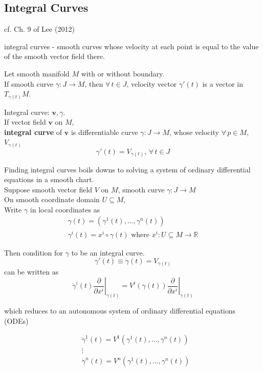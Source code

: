 \subsection{Integral Curves}

cf. Ch. 9 of Lee (2012) \cite{dgdt:JLee2012}

integral curves - smooth curves whose velocity at each point is equal to the value of the smooth vector field there. 

Let smooth manifold $M$ with or without boundary. \\
If smooth curve $\gamma : J \to M$, then $\forall \, t \in J$, velocity vector $\gamma'(t)$ is a vector in $T_{\gamma(t)}M$.  \\

\begin{definition}
Integral curve: $\mathbf{v}, \gamma$. \\
If vector field $\mathbf{v}$ on $M$, \\
\textbf{integral curve} of $\mathbf{v}$ is differentiable curve $\gamma : J \to M$, whose velocity $\forall \, p \in M$, $V_{\gamma(t)}$
\[
\gamma'(t) = V_{\gamma(t)}, \, \forall \, t \in J
\]
\end{definition}

Finding integral curves boils downs to solving a system of ordinary differential equations in a smooth chart. \\
Suppose smooth vector field $V$ on $M$, smooth curve $\gamma : J \to M$ \\
On smooth coordinate domain $U \subseteq M$, \\
Write $\gamma$ in local coordinates as 
\[
\begin{gathered}
	\gamma(t) = (\gamma^{1}(t), \dots , \gamma^{n}(t)) \\
	\gamma^i(t) = x^i \circ \gamma(t) \text{ where } x^i : U \subseteq M \to \mathbb{R} 
\end{gathered}
\]

Then condition for $\gamma$ to be an integral curve.
\[
\gamma'(t) \equiv \dot{\gamma}(t) = V_{\gamma(t)}
\]
can be written as 
\[
\dot{\gamma}^i(t) \left. \frac{\partial}{\partial x^i} \right|_{\gamma(t)} = V^i(\gamma(t)) \left. \frac{\partial }{ \partial x^i } \right|_{\gamma(t)}
\]

which reduces to an autonomous system of ordinary differential equations (ODEs)

\begin{equation}
\begin{aligned} 
& \dot{\gamma}^1(t) = V^1(\gamma^1(t), \dots, \gamma^n(t)) \\ 
& \vdots \\ 
& \dot{\gamma}^n(t) = V^n(\gamma^1(t), \dots , \gamma^n(t))
\end{aligned} 
\end{equation}

